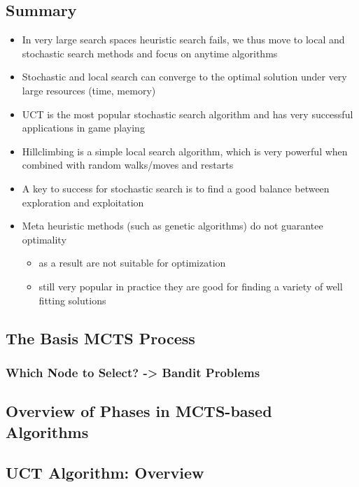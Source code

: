 \documentclass[conference, a4paper]{styles/acmsiggraph}
\begin{document}
    \subsection{Summary}
        \begin{itemize}
            \item In very large search spaces heuristic search fails, we thus move to local and stochastic search methods and focus on anytime algorithms
            \item Stochastic and local search can converge to the optimal solution under very large resources (time, memory)
            \item UCT is the most popular stochastic search algorithm and has very successful applications in game playing
            \item Hillclimbing is a simple local search algorithm, which is very powerful when combined with random walks/moves and restarts
            \item A key to success for stochastic search is to find a good balance between exploration and exploitation
            \item Meta heuristic methods (such as genetic algorithms) do not guarantee optimality
                \begin{itemize}
                    \item as a result are not suitable for optimization
                    \item still very popular in practice they are good for finding a variety of well fitting solutions
                \end{itemize}
        \end{itemize}
    
    \subsection{The Basis MCTS Process}
        \subsubsection{Which Node to Select? -> Bandit Problems}
    \subsection{Overview of Phases in MCTS-based Algorithms}
    \subsection{UCT Algorithm: Overview}
\end{document}
